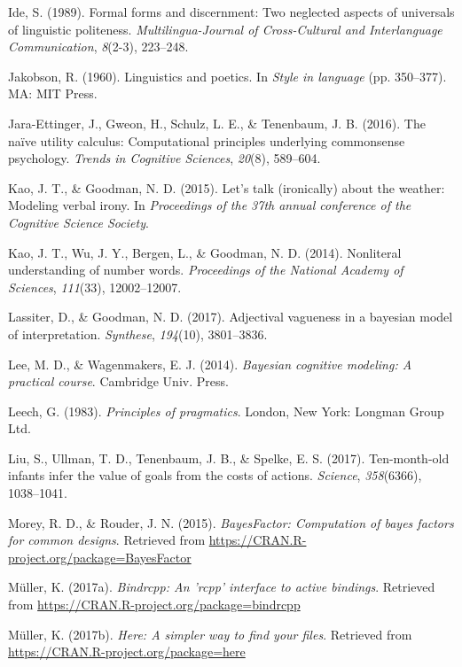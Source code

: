 \documentclass[floatsintext,man]{apa6}
\theoremstyle{definition}
\theoremstyle{definition}
\theoremstyle{definition}
\theoremstyle{remark}
\begin{document}
\hypertarget{ref-ide1989}{}
Ide, S. (1989). Formal forms and discernment: Two neglected aspects of
universals of linguistic politeness. \emph{Multilingua-Journal of
Cross-Cultural and Interlanguage Communication}, \emph{8}(2-3),
223--248.

\hypertarget{ref-jakobson1960}{}
Jakobson, R. (1960). Linguistics and poetics. In \emph{Style in
language} (pp. 350--377). MA: MIT Press.

\hypertarget{ref-jara2016naive}{}
Jara-Ettinger, J., Gweon, H., Schulz, L. E., \& Tenenbaum, J. B. (2016).
The naïve utility calculus: Computational principles underlying
commonsense psychology. \emph{Trends in Cognitive Sciences},
\emph{20}(8), 589--604.

\hypertarget{ref-kao2015}{}
Kao, J. T., \& Goodman, N. D. (2015). Let's talk (ironically) about the
weather: Modeling verbal irony. In \emph{Proceedings of the 37th annual
conference of the Cognitive Science Society}.

\hypertarget{ref-kao2014}{}
Kao, J. T., Wu, J. Y., Bergen, L., \& Goodman, N. D. (2014). Nonliteral
understanding of number words. \emph{Proceedings of the National Academy
of Sciences}, \emph{111}(33), 12002--12007.

\hypertarget{ref-lassiter2017adjectival}{}
Lassiter, D., \& Goodman, N. D. (2017). Adjectival vagueness in a
bayesian model of interpretation. \emph{Synthese}, \emph{194}(10),
3801--3836.

\hypertarget{ref-lee2014}{}
Lee, M. D., \& Wagenmakers, E. J. (2014). \emph{Bayesian cognitive
modeling: A practical course}. Cambridge Univ. Press.

\hypertarget{ref-leech1983}{}
Leech, G. (1983). \emph{Principles of pragmatics}. London, New York:
Longman Group Ltd.

\hypertarget{ref-liu2017ten}{}
Liu, S., Ullman, T. D., Tenenbaum, J. B., \& Spelke, E. S. (2017).
Ten-month-old infants infer the value of goals from the costs of
actions. \emph{Science}, \emph{358}(6366), 1038--1041.

\hypertarget{ref-R-BayesFactor}{}
Morey, R. D., \& Rouder, J. N. (2015). \emph{BayesFactor: Computation of
bayes factors for common designs}. Retrieved from
\url{https://CRAN.R-project.org/package=BayesFactor}

\hypertarget{ref-R-bindrcpp}{}
Müller, K. (2017a). \emph{Bindrcpp: An 'rcpp' interface to active
bindings}. Retrieved from
\url{https://CRAN.R-project.org/package=bindrcpp}

\hypertarget{ref-R-here}{}
Müller, K. (2017b). \emph{Here: A simpler way to find your files}.
Retrieved from \url{https://CRAN.R-project.org/package=here}
\end{document}
